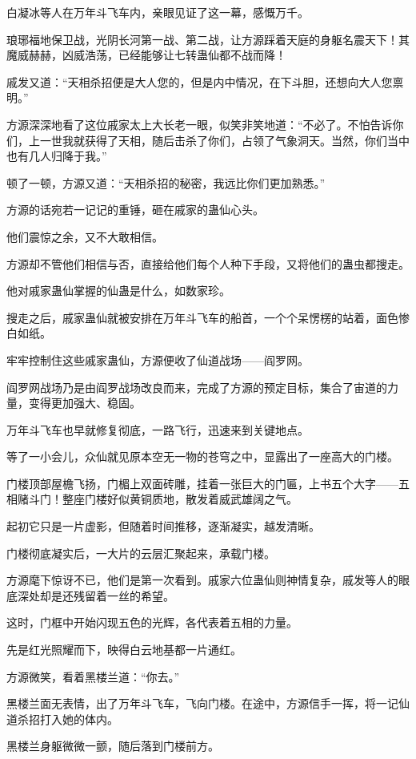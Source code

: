 \begin{this_body}
白凝冰等人在万年斗飞车内，亲眼见证了这一幕，感慨万千。

琅琊福地保卫战，光阴长河第一战、第二战，让方源踩着天庭的身躯名震天下！其魔威赫赫，凶威浩荡，已经能够让七转蛊仙都不战而降！

戚发又道：“天相杀招便是大人您的，但是内中情况，在下斗胆，还想向大人您禀明。”

方源深深地看了这位戚家太上大长老一眼，似笑非笑地道：“不必了。不怕告诉你们，上一世我就获得了天相，随后击杀了你们，占领了气象洞天。当然，你们当中也有几人归降于我。”

顿了一顿，方源又道：“天相杀招的秘密，我远比你们更加熟悉。”

方源的话宛若一记记的重锤，砸在戚家的蛊仙心头。

他们震惊之余，又不大敢相信。

方源却不管他们相信与否，直接给他们每个人种下手段，又将他们的蛊虫都搜走。

他对戚家蛊仙掌握的仙蛊是什么，如数家珍。

搜走之后，戚家蛊仙就被安排在万年斗飞车的船首，一个个呆愣楞的站着，面色惨白如纸。

牢牢控制住这些戚家蛊仙，方源便收了仙道战场——阎罗网。

阎罗网战场乃是由阎罗战场改良而来，完成了方源的预定目标，集合了宙道的力量，变得更加强大、稳固。

万年斗飞车也早就修复彻底，一路飞行，迅速来到关键地点。

等了一小会儿，众仙就见原本空无一物的苍穹之中，显露出了一座高大的门楼。

门楼顶部屋檐飞扬，门楣上双面砖雕，挂着一张巨大的门匾，上书五个大字——五相赌斗门！整座门楼好似黄铜质地，散发着威武雄阔之气。

起初它只是一片虚影，但随着时间推移，逐渐凝实，越发清晰。

门楼彻底凝实后，一大片的云层汇聚起来，承载门楼。

方源麾下惊讶不已，他们是第一次看到。戚家六位蛊仙则神情复杂，戚发等人的眼底深处却是还残留着一丝的希望。

这时，门框中开始闪现五色的光辉，各代表着五相的力量。

先是红光照耀而下，映得白云地基都一片通红。

方源微笑，看着黑楼兰道：“你去。”

黑楼兰面无表情，出了万年斗飞车，飞向门楼。在途中，方源信手一挥，将一记仙道杀招打入她的体内。

黑楼兰身躯微微一颤，随后落到门楼前方。


\end{this_body}
